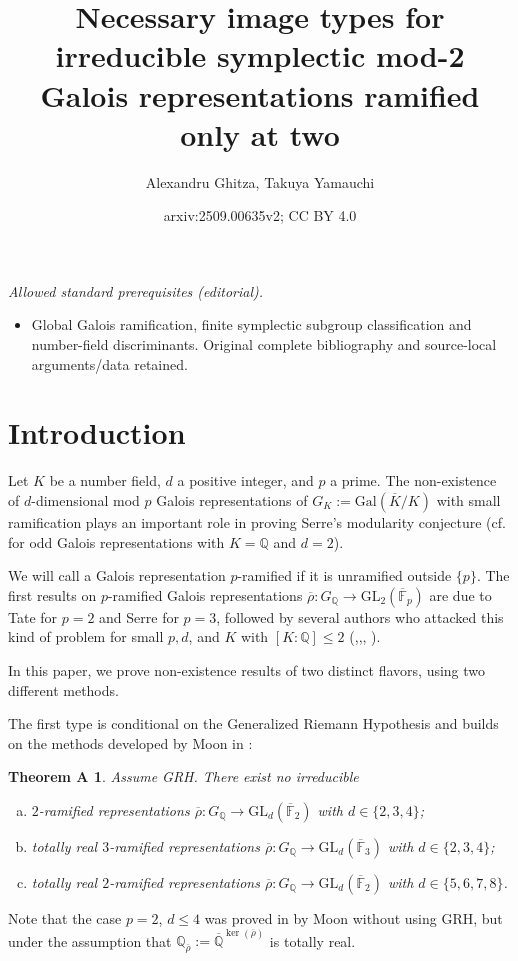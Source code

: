 \documentclass{amsart}
\title{Necessary image types for irreducible symplectic mod-2 Galois representations ramified only at two}
\author{Alexandru Ghitza, Takuya Yamauchi}
\date{arxiv:2509.00635v2; CC BY 4.0}
\newtheorem*{theoremA}{Theorem A}
\theoremstyle{definition}
\newcommand{\lra}{\longrightarrow}
\newcommand{\Q}{\mathbb{Q}}
\newcommand{\F}{\mathbb{F}}
\newcommand{\bQ}{\overline{{\Q}}}
\newcommand{\bF}{\overline{\F}}
\newcommand{\br}{\overline{\rho}}
\newcommand{\GL}{\mathrm{GL}}
\newcommand{\Gal}{\mathrm{Gal}}
\renewcommand{\leq}{\leqslant}
\renewcommand{\le}{\leqslant}
\begin{document}
\maketitle
\noindent\textit{Allowed standard prerequisites (editorial).}\begin{itemize}
\item Global Galois ramification, finite symplectic subgroup classification and number-field discriminants. Original complete bibliography and source-local arguments/data retained.
\end{itemize}\medskip
\section{Introduction}\label{intro}
%

Let $K$ be a number field, $d$ a positive integer, and $p$ a prime.
The non-existence of $d$-dimensional mod $p$ Galois representations of
$G_K:=\Gal(\overline{K}/K)$ with small ramification plays an important role in proving Serre's modularity conjecture
(cf. \cite{KW} for odd Galois representations with $K=\Q$ and $d=2$).

We will call a Galois representation $p$-ramified if it is unramified outside $\{p\}$.
The first results on $p$-ramified Galois representations $\br:G_\Q\lra \GL_2(\bF_p)$ are due to Tate \cite{Ta} for $p=2$ and Serre \cite{Se1} for $p=3$, followed by several authors who attacked this kind of problem for small $p,d$, and $K$ with $[K:\Q]\le 2$ (\cite{Mo2},\cite{MT},\cite{S}, \cite{GM}).

In this paper, we prove non-existence results of two distinct flavors, using two different methods.

The first type is conditional on the Generalized Riemann Hypothesis and builds on the methods developed by Moon in \cite{Mo1,Mo2}:
\begin{theoremA}
  Assume GRH.
  There exist no irreducible
  \begin{enumerate}[(a)]
    \item  $2$-ramified representations $\br:G_\Q\lra\GL_d(\bF_2)$ with $d\in\{2,3,4\}$;

    \item totally real $3$-ramified representations $\br:G_\Q\lra\GL_d(\bF_3)$ with $d\in\{2,3,4\}$;

    \item totally real $2$-ramified representations $\br:G_\Q\lra\GL_d(\bF_2)$ with $d\in\{5,6,7,8\}$.
  \end{enumerate}
\end{theoremA}
Note that the case $p=2$, $d\leq 4$ was proved in \cite{Mo2} by Moon without using GRH, but under the assumption that $\Q_{\br}:=\bQ^{\ker(\br)}$ is totally real.
\end{document}
